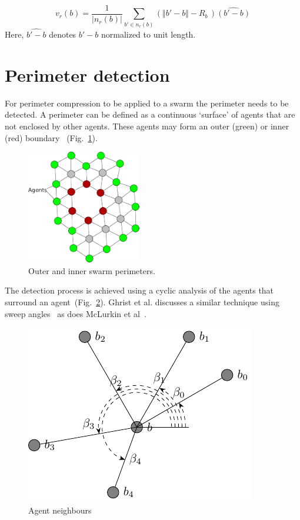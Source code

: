 \documentclass[12pt,a4paper]{IEEEtran}
\newcommand{\magn}[1]{\Vert{#1}\Vert}
\newcommand{\card}[1]{\vert{#1}\vert}
\newcommand{\vbb}[2]{#2-#1}
\begin{document}
\begin{equation}\label{eq:repulsion2a}
v_r(b) = \frac{1}{\card{n_r(b)}}\sum_{b' \in n_r(b)} \left(\magn{\vbb{b}{b'}} - R_b \, \right)\widehat{\left(\vbb{b}{b'}\right)}
\end{equation}
Here, $\widehat{\vbb{b}{b'}}$ denotes $\vbb{b}{b'}$ normalized to unit length.

\section{Perimeter detection}\label{sec:perimeterDetection}
For perimeter compression to be applied to a swarm the perimeter needs to be detected. A perimeter can be defined as a continuous `surface' of agents that are not enclosed by other agents. These  agents may form an outer ({\color{green}green}) or inner ({\color{red}red}) boundary ~(Fig.~\ref{fig:innerOuterPerimeters}).

\begin{figure}[H]
	\begin{center}
		\includegraphics[width=5cm]{figures/PerimeterBots1}
	\end{center}
	\caption{{\color{green}Outer} and {\color{red}inner} swarm perimeters. \label{fig:innerOuterPerimeters}}
\end{figure}

The detection process is achieved using a cyclic analysis of the agents that surround an agent~(Fig.~\ref{fig:neighbours2}). Ghrist et al. discusses a similar technique using sweep angles~\cite{ghrist2008surrounding} as does McLurkin et al~\cite{mclurkin2009}. 

\begin{figure}[H]
	\centering
	\includegraphics[width=0.8\linewidth]{figures/neighbours2}
	\caption[Agent neighbours]{Agent neighbours}
	\label{fig:neighbours2}
\end{figure}
\end{document}
